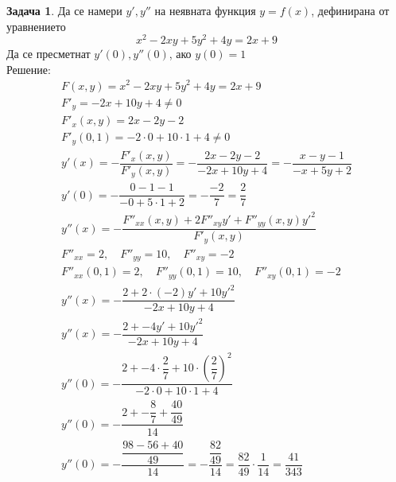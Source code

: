 \documentclass[a4paper,fleqn,12pt]{article}
\theoremstyle{definition}
\newtheorem{task}{Задача}[subsection]
\begin{document}
\begin{task}
Да се намери $y', y''$ на неявната функция $y = f(x)$, дефинирана от уравнението 
$$x^2 - 2xy + 5y^2 + 4y = 2x + 9$$
Да се пресметнат $y'(0), y''(0)$, ако $y(0) = 1$ \\
Решение: 
\begin{gather*}
F(x,y) = x^2 - 2xy + 5y^2 + 4y = 2x + 9\\
F'_y = -2x + 10y + 4 \neq 0\\
F'_x(x,y) = 2x - 2y - 2\\
F'_y(0,1) = -2 \cdot 0 + 10 \cdot 1 + 4 \neq 0\\
y'(x) = - \dfrac{F'_x(x,y)}{F'_y(x,y)} = - \dfrac{2x - 2y - 2}{-2x + 10y + 4} = - \dfrac{x - y - 1}{- x + 5y + 2}\\
y'(0) = - \dfrac{0 - 1 - 1}{- 0 + 5 \cdot 1 + 2} = - \dfrac{-2}{7} = \dfrac{2}{7}\\
y''(x) = - \dfrac{F''_{xx}(x,y) + 2F''_{xy}y' + F''_{yy}(x,y)y'^2}{F'_y(x,y)}\\
F''_{xx} = 2, \quad F''_{yy} = 10, \quad F''_{xy} = -2\\
F''_{xx}(0,1) = 2, \quad F''_{yy}(0,1) = 10, \quad F''_{xy}(0,1) = -2\\
y''(x) = - \dfrac{2 + 2 \cdot (-2)y' + 10y'^2}{-2x + 10y + 4}\\
y''(x) = - \dfrac{2 + - 4y' + 10y'^2}{-2x + 10y + 4}\\
y''(0) = - \dfrac{2 + - 4 \cdot \dfrac{2}{7} + 10 \cdot \left( \dfrac{2}{7} \right) ^2}{-2 \cdot 0 + 10 \cdot 1 + 4}\\
y''(0) = - \dfrac{2 + - \dfrac{8}{7} + \dfrac{40}{49}}{14}\\
y''(0) = - \dfrac{\dfrac{98 - 56 + 40}{49}}{14} = - \dfrac{\dfrac{82}{49}}{14} = \dfrac{82}{49} \cdot \dfrac{1}{14} = \dfrac{41}{343}\\
\end{gather*}
\end{task}
\end{document}
